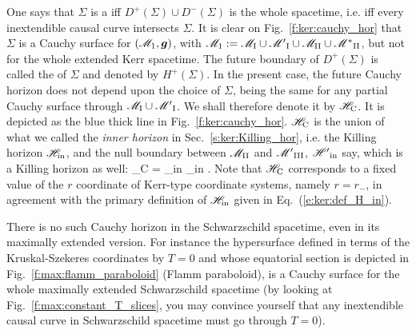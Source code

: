 One says that $\Sigma$ is a 
iff $D^+(\Sigma)\cup D^-(\Sigma)$ is the whole spacetime, i.e. iff
every inextendible causal curve intersects $\Sigma$.
It is clear on Fig.~\ref{f:ker:cauchy_hor} that $\Sigma$ is a Cauchy surface
for $(\mathscr{M}_1,\bm{g})$, with $\mathscr{M}_1 := \mathscr{M}_{\rm I}\cup{\mathscr{M}'}_{\rm I}\cup\mathscr{M}_{\rm II}\cup{\mathscr{M}^*}_{\rm II}$, but not for the whole extended Kerr spacetime. The future boundary of $D^+(\Sigma)$
is called the  of $\Sigma$ and denoted
by $H^+(\Sigma)$. In the present case, the future Cauchy horizon does not depend upon the
choice of $\Sigma$, being the same for any partial Cauchy surface through
$\mathscr{M}_{\rm I}\cup{\mathscr{M}'}_{\rm I}$. We shall therefore denote it by $\mathscr{H}_{\rm C}$.
It is depicted as the blue thick line in Fig.~\ref{f:ker:cauchy_hor}.
$\mathscr{H}_{\rm C}$ is the
union of what we called the \emph{inner horizon}
in Sec.~\ref{s:ker:Killing_hor}, i.e. the Killing horizon $\mathscr{H}_{\rm in}$,
and the null boundary between $\mathscr{M}_{\rm II}$ and ${\mathscr{M}'}_{\rm III}$, ${\mathscr{H}'}_{\rm in}$
say, which is a Killing horizon as well:
\be
    \Hor_{\rm C} = \Hor_{\rm in} _{\rm in} .
\ee
Note that $\mathscr{H}_{\rm C}$
corresponds to a fixed value of the $r$ coordinate of Kerr-type coordinate systems, namely
$r=r_-$, in agreement with the primary definition of $\mathscr{H}_{\rm in}$ given in Eq.~(\ref{e:ker:def_H_in}).

\begin{remark}
There is no such Cauchy horizon in the Schwarzschild spacetime, even in its
maximally extended version. For instance the hypersurface defined in
terms of the Kruskal-Szekeres coordinates by $T=0$ and whose equatorial section
is depicted in Fig.~\ref{f:max:flamm_paraboloid} (Flamm paraboloid), is a
Cauchy surface for the whole maximally extended Schwarzschild spacetime
(by looking at Fig.~\ref{f:max:constant_T_slices}, you may convince yourself
that any inextendible causal curve in Schwarzschild spacetime must go through $T=0$).
\end{remark}


